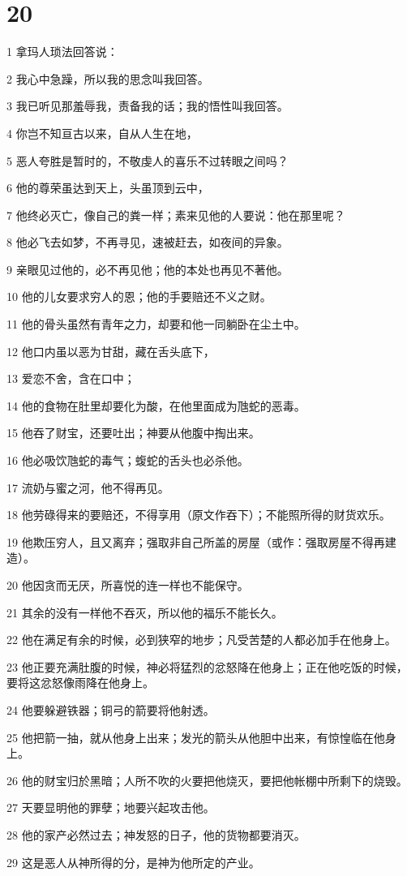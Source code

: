\chapter{20}

\par 1 拿玛人琐法回答说：
\par 2 我心中急躁，所以我的思念叫我回答。
\par 3 我已听见那羞辱我，责备我的话；我的悟性叫我回答。
\par 4 你岂不知亘古以来，自从人生在地，
\par 5 恶人夸胜是暂时的，不敬虔人的喜乐不过转眼之间吗？
\par 6 他的尊荣虽达到天上，头虽顶到云中，
\par 7 他终必灭亡，像自己的粪一样；素来见他的人要说：他在那里呢？
\par 8 他必飞去如梦，不再寻见，速被赶去，如夜间的异象。
\par 9 亲眼见过他的，必不再见他；他的本处也再见不著他。
\par 10 他的儿女要求穷人的恩；他的手要赔还不义之财。
\par 11 他的骨头虽然有青年之力，却要和他一同躺卧在尘土中。
\par 12 他口内虽以恶为甘甜，藏在舌头底下，
\par 13 爱恋不舍，含在口中；
\par 14 他的食物在肚里却要化为酸，在他里面成为虺蛇的恶毒。
\par 15 他吞了财宝，还要吐出；神要从他腹中掏出来。
\par 16 他必吸饮虺蛇的毒气；蝮蛇的舌头也必杀他。
\par 17 流奶与蜜之河，他不得再见。
\par 18 他劳碌得来的要赔还，不得享用（原文作吞下）；不能照所得的财货欢乐。
\par 19 他欺压穷人，且又离弃；强取非自己所盖的房屋（或作：强取房屋不得再建造）。
\par 20 他因贪而无厌，所喜悦的连一样也不能保守。
\par 21 其余的没有一样他不吞灭，所以他的福乐不能长久。
\par 22 他在满足有余的时候，必到狭窄的地步；凡受苦楚的人都必加手在他身上。
\par 23 他正要充满肚腹的时候，神必将猛烈的忿怒降在他身上；正在他吃饭的时候，要将这忿怒像雨降在他身上。
\par 24 他要躲避铁器；铜弓的箭要将他射透。
\par 25 他把箭一抽，就从他身上出来；发光的箭头从他胆中出来，有惊惶临在他身上。
\par 26 他的财宝归於黑暗；人所不吹的火要把他烧灭，要把他帐棚中所剩下的烧毁。
\par 27 天要显明他的罪孽；地要兴起攻击他。
\par 28 他的家产必然过去；神发怒的日子，他的货物都要消灭。
\par 29 这是恶人从神所得的分，是神为他所定的产业。

